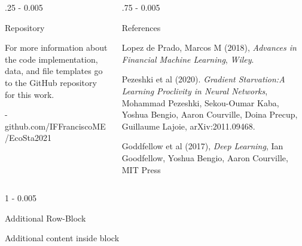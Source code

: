 \documentclass{postertheme}\usepackage[]{graphicx}\usepackage[]{color}
\begin{document}
\begin{frame}
\begin{columns}[onlytextwidth]
  
  \begin{column}{.25 \textwidth - 0.005 \textwidth}
    \begin{block}{Repository}
        
        For more information about the code implementation, data, and file templates go to the GitHub
        repository for this work.
        
        - github.com/IFFranciscoME/EcoSta2021
        
    \end{block}
  \end{column}
  
  \begin{column}{.75 \textwidth - 0.005 \textwidth}
    \begin{block}{References}
    
    \begin{thebibliography}{02}
              Lopez de Prado, Marcos M (2018), \textit{Advances in Financial Machine Learning}, \emph{Wiley}.

               Pezeshki et al (2020). \textit{Gradient Starvation:A Learning Proclivity in Neural Networks},
               Mohammad Pezeshki, Sekou-Oumar Kaba, Yoshua Bengio, Aaron Courville, Doina Precup,
               Guillaume Lajoie, arXiv:2011.09468.
                                                     
               Goddfellow et al (2017), \textit{Deep Learning}, Ian Goodfellow, Yoshua Bengio,
               Aaron Courville, MIT Press
    \end{thebibliography}
    
    \end{block}
  \end{column}
\end{columns}


\begin{columns}[onlytextwidth]
  
  \begin{column}{1 \textwidth - 0.005 \textwidth}
    \begin{block}{Additional Row-Block}
        
      Additional content inside block
        
    \end{block}
  \end{column}
\end{columns}

\end{frame}
\end{document}

